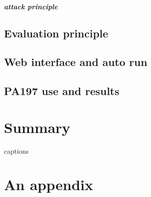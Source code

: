 \documentclass[
  digital, %
  table,   %
  nolof,     %
  nolot,     %
           oneside
]{fithesis3}
\begin{document}
    \paragraph{attack principle}
    
  \section{Evaluation principle}\label{sec:eval}
  \section{Web interface and auto run}
  \section{PA197 use and results}
\chapter{Summary}




{\csname captions\languagename\endcsname %
\makeatletter %
  \thesis@selectLocale{\thesis@locale}\makeatother
\printbibliography[heading=bibintoc]} %

\appendix %
\chapter{An appendix}
\end{document}
